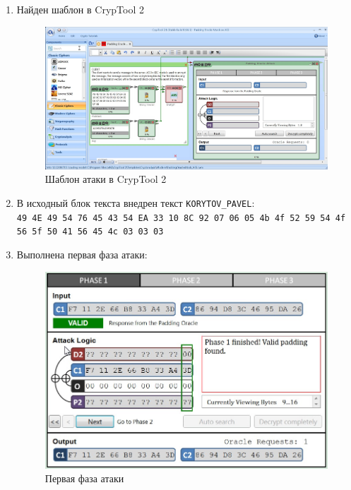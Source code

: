 \documentclass[a4paper, 14pt]{extarticle}
\begin{document}
\begin{enumerate}
    \item Найден шаблон в CrypTool 2
        \begin{figure}[h]
            \centering
            \includegraphics[width=\textwidth]{img/S019.jpg}
            \caption{Шаблон атаки в CrypTool 2}%
        \end{figure}
    \item В исходный блок текста внедрен текст \texttt{KORYTOV\_PAVEL}:\\
    \texttt{49 4E 49 54 76 45 43 54 EA 33 10 8C 92 07 06 05 4b 4f 52 59 54 4f 56 5f 50 41 56 45 4c 03 03 03}
    \item Выполнена первая фаза атаки:
    \begin{figure}[h]
        \centering
        \includegraphics[width=\textwidth]{img/S020.jpg}
        \caption{Первая фаза атаки}%
        \label{img:}
    \end{figure}
    \FloatBarrier{}
    

\end{enumerate}
\end{document}
